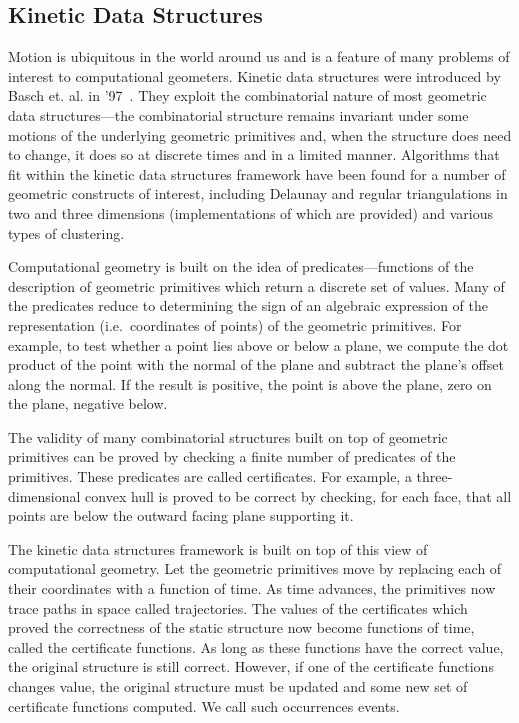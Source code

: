 \subsection{Kinetic Data Structures}
Motion is ubiquitous in the world around us and is a feature of many
problems of interest to computational geometers. Kinetic data
structures were introduced by Basch et. al. in
'97~\cite{Basch97}. They exploit the combinatorial nature of most
geometric data structures---the combinatorial structure remains
invariant under some motions of the underlying geometric primitives
and, when the structure does need to change, it does so at discrete
times and in a limited manner. Algorithms that fit within the kinetic
data structures framework have been found for a number of geometric
constructs of interest, including Delaunay and regular triangulations
in two and three dimensions (implementations of which are provided)
and various types of clustering.

Computational geometry is built on the idea of
predicates---functions of the description of geometric
primitives which return a discrete set of values. Many of the
predicates reduce to determining the sign of an algebraic expression
of the representation (i.e.\ coordinates of points) of the geometric
primitives. For example, to test whether a point lies above or below a
plane, we compute the dot product of the point with the normal of the
plane and subtract the plane's offset along the normal. If the result
is positive, the point is above the plane, zero on the plane, negative
below.

The validity of many combinatorial structures built on top of
geometric primitives can be proved by checking a finite number of
predicates of the primitives. These predicates are called 
  certificates. For example, a three-dimensional convex hull is
proved to be correct by checking, for each face, that all points are
below the outward facing plane supporting it.

The kinetic data structures framework is built on top of this view of
computational geometry. Let the geometric primitives move by replacing
each of their coordinates with a function of time. As time advances,
the primitives now trace paths in space called trajectories. The
values of the certificates which proved the correctness of the static
structure now become functions of time, called the certificate
  functions. As long as these functions have the correct value, the
original structure is still correct. However, if one of the
certificate functions changes value, the original structure must be
updated and some new set of certificate functions computed. We call
such occurrences events.


